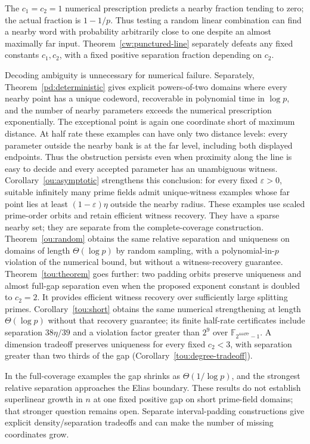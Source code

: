 \documentclass[11pt,letterpaper]{article}
\theoremstyle{definition}
\theoremstyle{remark}
\newcommand{\F}{\mathbb F}
\begin{document}
The $c_1=c_2=1$ numerical prescription predicts a nearby fraction
tending to zero; the actual fraction is $1-1/p$. Thus testing a random
linear combination can find a nearby word with probability arbitrarily
close to one despite an almost maximally far input. Theorem~\ref{cw:punctured-line}
separately defeats any fixed constants $c_1,c_2$, with a fixed positive
separation fraction depending on $c_2$.

Decoding ambiguity is unnecessary for numerical failure. Separately,
Theorem~\ref{pd:deterministic} gives explicit powers-of-two domains where
every nearby point has a unique codeword, recoverable in polynomial time
in $\log p$, and the number of nearby parameters exceeds the numerical
prescription exponentially. The exceptional point is again one coordinate
short of maximum distance. At half rate these examples can have only two
distance levels: every parameter outside the nearby bank is at the far
level, including both displayed endpoints. Thus the obstruction persists
even when proximity along the line
is easy to decide and every accepted parameter has an unambiguous witness.
Corollary~\ref{ou:asymptotic} strengthens this conclusion: for every
fixed $\varepsilon>0$, suitable infinitely many prime fields admit
unique-witness examples whose far point lies at least $(1-\varepsilon)\eta$
outside the nearby radius. These examples use scaled prime-order orbits
and retain efficient witness recovery. They have a sparse nearby set;
they are separate from the complete-coverage construction.
Theorem~\ref{ou:random} obtains the same relative separation and
uniqueness on domains of length $\Theta(\log p)$ by random sampling,
with a polynomial-in-$p$ violation of the numerical bound, but without
a witness-recovery guarantee.
Theorem~\ref{tou:theorem} goes further: two padding orbits preserve
uniqueness and almost full-gap separation even when the proposed
exponent constant is doubled to $c_2=2$. It provides efficient witness
recovery over sufficiently large splitting primes.
Corollary~\ref{tou:short} obtains the same numerical strengthening at
length $\Theta(\log p)$ without that recovery guarantee; its finite
half-rate certificates include separation $38\eta/39$ and a violation
factor greater than $2^9$ over $\F_{2^{44497}-1}$.
A dimension tradeoff preserves uniqueness for every fixed $c_2<3$,
with separation greater than two thirds of the gap
(Corollary~\ref{tou:degree-tradeoff}).

In the full-coverage examples the gap shrinks as $\Theta(1/\log p)$,
and the strongest relative separation approaches the Elias boundary. These results do not
establish superlinear growth in $n$ at one fixed positive gap on short
prime-field domains; that stronger question remains open. Separate
interval-padding constructions give explicit density/separation
tradeoffs and can make the number of missing coordinates grow.
\end{document}
